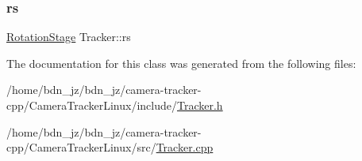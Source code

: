 \mbox{\label{class_tracker_ad671e7016dce486eab4eb384d0443446}} 
\subsubsection{\texorpdfstring{rs}{rs}}
{\footnotesize\ttfamily \hyperlink{class_rotation_stage}{Rotation\+Stage} Tracker\+::rs\hspace{0.3cm}{\ttfamily [private]}}



The documentation for this class was generated from the following files\+:\begin{DoxyCompactItemize}
\item 
/home/bdn\+\_\+jz/bdn\+\_\+jz/camera-\/tracker-\/cpp/\+Camera\+Tracker\+Linux/include/\hyperlink{_tracker_8h}{Tracker.\+h}\item 
/home/bdn\+\_\+jz/bdn\+\_\+jz/camera-\/tracker-\/cpp/\+Camera\+Tracker\+Linux/src/\hyperlink{_tracker_8cpp}{Tracker.\+cpp}\end{DoxyCompactItemize}
